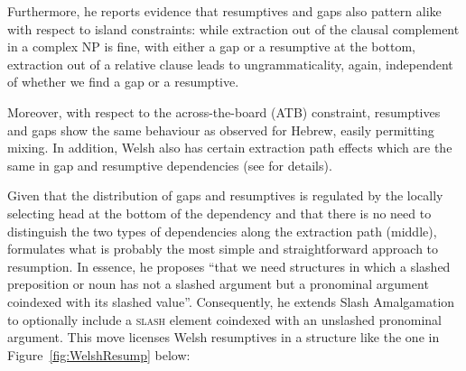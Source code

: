 \documentclass[output=paper
                ,modfonts
                ,nonflat
	        ,collection
	        ,collectionchapter
	        ,collectiontoclongg
 	        ,biblatex
                ,babelshorthands
                ,newtxmath
                ,draftmode
                ,colorlinks, citecolor=brown
]{./langsci/langscibook}
\begin{document}
{Furthermore, he reports evidence that resumptives and gaps also
pattern alike with respect to island constraints: while extraction out
of the clausal complement in a complex NP is fine, with either a gap
or a resumptive at the bottom, extraction out of a relative clause leads to
ungrammaticality, again, independent of whether we find a gap or a
resumptive.

\begin{exe}
\end{exe}

\noindent
Moreover, with respect to the across-the-board (ATB) constraint,
resumptives and gaps show the same behaviour as observed for Hebrew,
easily permitting mixing. In addition, Welsh also has certain
extraction path effects which are the same in gap and resumptive
dependencies (see \citealp{Borsley:10} for details).

Given that the distribution of gaps and resumptives is regulated by
the locally selecting head at the bottom of the dependency and that
there is no need to distinguish the two types of dependencies along
the extraction path (middle), \citet[97]{Borsley:10} formulates what is
probably the most simple and straightforward approach to
resumption. In essence, he proposes ``that we need structures in which
a slashed preposition or noun has not a slashed argument but a
pronominal argument coindexed with its slashed value''. Consequently,
he extends Slash Amalgamation to optionally include a
\textsc{slash} element coindexed with an unslashed pronominal
argument. This move licenses Welsh resumptives in a structure like the
one in Figure~\ref{fig:WelshResump} below:

}
\end{document}
